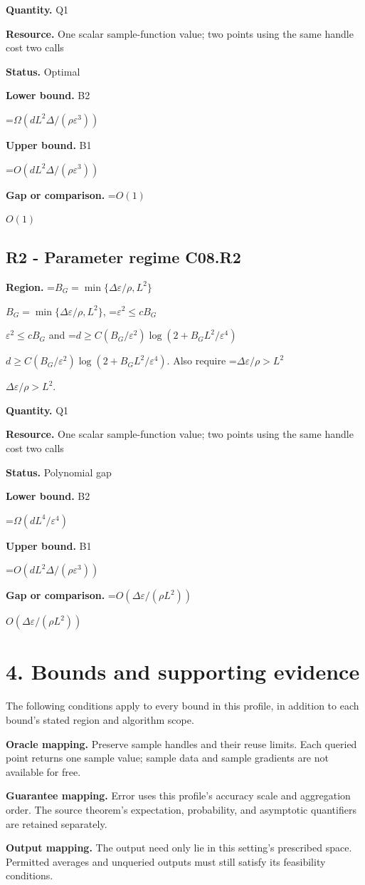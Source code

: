 \documentclass[10pt,a4paper]{article}
\newcommand{\AtlasMath}[1]{\par\begingroup\centering\setbox0=\hbox{$\displaystyle #1$}\ifdim\wd0>1.4\linewidth\typeout{ATLAS WIDE FORMULA: \the\wd0}\fi\ifdim\wd0>\linewidth\resizebox{\linewidth}{!}{\box0}\else\box0\fi\par\endgroup}
\newcommand{\AtlasInlineMath}[1]{\begingroup\setbox0=\hbox{$#1$}\ifdim\wd0>.4\linewidth\endgroup\AtlasMath{#1}\else\endgroup$#1$\fi}
\begin{document}
\textbf{Quantity.} Q1

\textbf{Resource.} One scalar sample-function value; two points using the same handle cost two calls

\textbf{Status.} Optimal

\textbf{Lower bound.} B2

\AtlasMath{\Omega(dL^2\Delta/(\rho\varepsilon^3))}
\textbf{Upper bound.} B1

\AtlasMath{O(dL^2\Delta/(\rho\varepsilon^3))}
\textbf{Gap or comparison.} \AtlasInlineMath{O(1)}

\subsection{R2 - Parameter regime C08.R2}
\textbf{Region.} \AtlasInlineMath{B_G=\min\{\Delta\varepsilon/\rho,L^2\}}, \AtlasInlineMath{\varepsilon^2\le cB_G} and \AtlasInlineMath{d\ge C(B_G/\varepsilon^2)\log(2+B_GL^2/\varepsilon^4)}. Also require \AtlasInlineMath{\Delta\varepsilon/\rho>L^2}.

\textbf{Quantity.} Q1

\textbf{Resource.} One scalar sample-function value; two points using the same handle cost two calls

\textbf{Status.} Polynomial gap

\textbf{Lower bound.} B2

\AtlasMath{\Omega(dL^4/\varepsilon^4)}
\textbf{Upper bound.} B1

\AtlasMath{O(dL^2\Delta/(\rho\varepsilon^3))}
\textbf{Gap or comparison.} \AtlasInlineMath{O(\Delta\varepsilon/(\rho L^2))}

\section{4. Bounds and supporting evidence}
The following conditions apply to every bound in this profile, in addition to each bound's stated region and algorithm scope.

\textbf{Oracle mapping.} Preserve sample handles and their reuse limits. Each queried point returns one sample value; sample data and sample gradients are not available for free.

\textbf{Guarantee mapping.} Error uses this profile's accuracy scale and aggregation order. The source theorem's expectation, probability, and asymptotic quantifiers are retained separately.

\textbf{Output mapping.} The output need only lie in this setting's prescribed space. Permitted averages and unqueried outputs must still satisfy its feasibility conditions.
\end{document}
